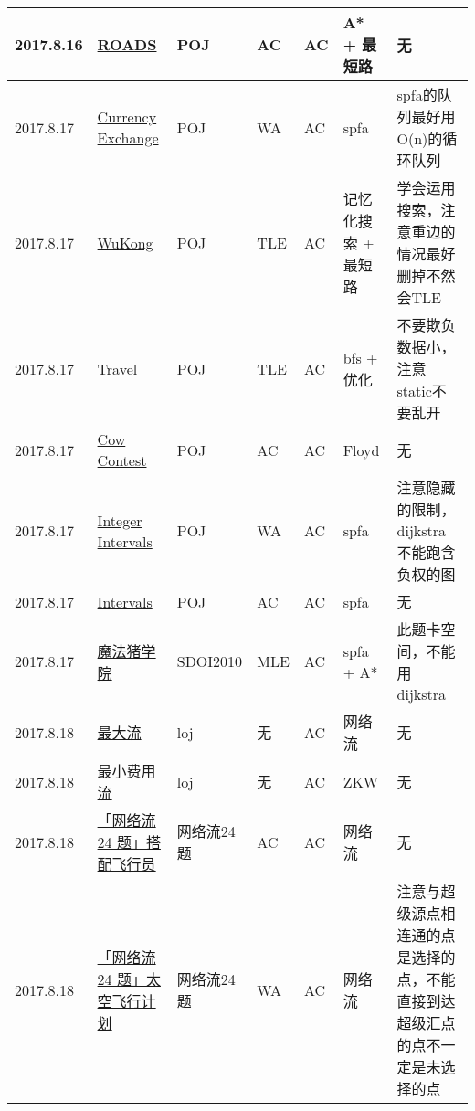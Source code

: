 \documentclass[a4paper]{article}
\begin{document}
\begin{longtable}{|p{1.5cm}|p{2.5cm}|p{1.6cm}|p{1.6cm}|p{1cm}|p{3cm}|p{4cm}|}
		\hline
		2017.8.16 & \href {https://vjudge.net/problem/POJ-1724}{ROADS}
		 & POJ & AC & AC & A* + 最短路 & 无\\
		
		\hline
		2017.8.17 & \href {https://vjudge.net/problem/POJ-1860}{Currency Exchange}
		 & POJ & WA & AC & spfa & spfa的队列最好用O(n)的循环队列\\
		
		\hline
		2017.8.17 & \href {https://vjudge.net/problem/HDU-2833}{WuKong}
		 & POJ & TLE & AC & 记忆化搜索 + 最短路 & 学会运用搜索，注意重边的情况最好删掉不然会TLE\\
		
		\hline
		2017.8.17 & \href {https://vjudge.net/problem/HDU-2433}{Travel}
		 & POJ & TLE & AC & bfs + 优化 & 不要欺负数据小，注意static不要乱开\\
		
		\hline
		2017.8.17 & \href {https://vjudge.net/problem/POJ-3660}{Cow Contest}
		 & POJ & AC & AC & Floyd & 无\\
		
		\hline
		2017.8.17 & \href {https://vjudge.net/problem/POJ-1716}{Integer Intervals}
		 & POJ & WA & AC & spfa & 注意隐藏的限制，dijkstra不能跑含负权的图\\
		
		\hline
		2017.8.17 & \href {https://vjudge.net/problem/POJ-1201}{Intervals}
		 & POJ & AC & AC & spfa & 无\\
		
		\hline
		2017.8.17 & \href {http://www.lydsy.com/JudgeOnline/problem.php?id=1975}{魔法猪学院}
		 & SDOI2010 & MLE & AC & spfa + A* & 此题卡空间，不能用dijkstra\\
		
		\hline
		2017.8.18 & \href {https://loj.ac/problem/101}{最大流}
		 & loj & 无 & AC & 网络流 & 无\\
		
		\hline
		2017.8.18 & \href {https://loj.ac/problem/102}{最小费用流}
		 & loj & 无 & AC & ZKW & 无\\
		
		\hline
		2017.8.18 & \href {https://loj.ac/problem/6000}{「网络流 24 题」搭配飞行员}
		 & 网络流24题 & AC & AC & 网络流 & 无\\
		
		\hline
		2017.8.18 & \href {https://loj.ac/problem/6001}{「网络流 24 题」太空飞行计划}
		 & 网络流24题 & WA & AC & 网络流 & 注意与超级源点相连通的点是选择的点，不能直接到达超级汇点的点不一定是未选择的点\\
		

\end{longtable}
\end{document}

